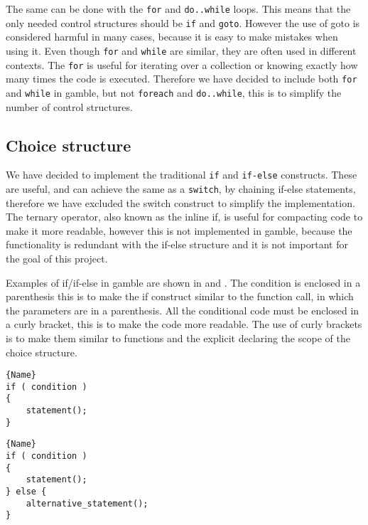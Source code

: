 The same can be done with the \texttt{for} and \texttt{do..while} loops. 
This means that the only needed control structures should be \texttt{if} and \texttt{goto}. 
However the use of goto is considered harmful in many cases, because it is easy to make mistakes when using it. \citep{DijkstraGoto}
Even though \texttt{for} and \texttt{while} are similar, they are often used in different contexts.
The \texttt{for} is useful for iterating over a collection or knowing exactly how many times the code is executed. 
Therefore we have decided to include both \texttt{for} and \texttt{while} in \gls{gamble}, but not \texttt{foreach} and \texttt{do..while}, this is to simplify the number of control structures.

\subsection{Choice structure}
We have decided to implement the traditional \texttt{if} and \texttt{if-else} constructs. 
These are useful, and can achieve the same as a \texttt{switch}, by chaining if-else statements, therefore we have excluded the switch construct to simplify the implementation. 
The ternary operator, also known as the inline if, is useful for compacting code to make it more readable, however this is not implemented in \gls{gamble}, because the functionality is redundant with the if-else structure and it is not important for the goal of this project.

Examples of if/if-else in \gls{gamble} are shown in  and . 
The condition is enclosed in a parenthesis this is to make the if construct similar to the function call, in which the parameters are in a parenthesis. 
All the conditional code must be enclosed in a curly bracket, this is to make the code more readable. 
The use of curly brackets is to make them similar to functions and the explicit declaring the scope of the choice structure.

\noindent\begin{minipage}{.45\textwidth}
\begin{lstlisting}[caption=An if construct in \gls{gamble}.,frame=tlrb, label=iflst, numbers=none]{Name}
if ( condition )
{
    statement();
}
\end{lstlisting}
\end{minipage}\hfill
\begin{minipage}{.45\textwidth}
\begin{lstlisting}[caption=An if-else construct in \gls{gamble}.,frame=tlrb, label=ifelselst, numbers=none]{Name}
if ( condition )
{
    statement();
} else {
    alternative_statement();
}
\end{lstlisting}
\end{minipage}


